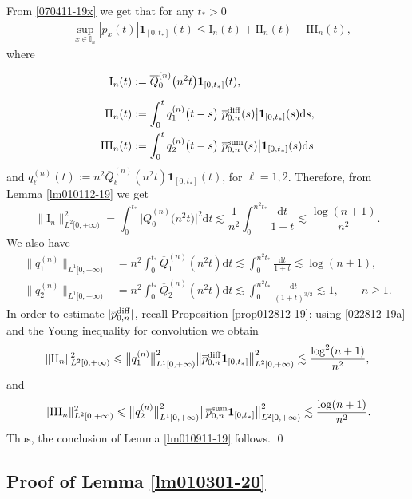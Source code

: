 \documentclass[EJP]{ejpecp} %
\newcommand\T{{\mathbb I}}
\renewcommand{\ge}{\geqslant}
\renewcommand{\le}{\leqslant}
\newcommand{\dd  }{\mathrm{d}}
\renewcommand{\bar}{\overline}
\numberwithin{equation}{section}
\begin{document}
From \eqref{070411-19x} we get that for any $t_*>0$
\begin{align}
  \label{070411-19xs}
  & 
\sup_{x\in\T_n}|\bar p_x(t)|\mathbf{1}_{[0,t_*]}(t)
   \le \mathrm{I}_{n}(t)+ \mathrm{II}_{n}(t)+ \mathrm{III}_{n}(t),
\end{align}
where
\begin{align*}
\mathrm{I}_{n}(t)&:=\bar Q_{0}^{(n)}\big(n^2t\big) \mathbf{1}_{[0,t_*]}(t), \vphantom{\bigg(} \\
\mathrm{II}_{n}(t)&:=\int_0^tq_{1}^{(n)}\big(t-s\big)\big|\bar
    p_{0,n}^{\rm diff}(s) \big| \mathbf{1}_{[0,t_*]}(s)\dd s,\notag\\
 \mathrm{III}_{n}(t)&:=\int_0^tq_{2}^{(n)}\big(t-s\big)
    \big|\bar p_{0,n}^{\rm sum}(s)\big|\mathbf{1}_{[0,t_*]}(s) \dd s
\end{align*}
and 
 $q_{\ell}^{(n)}(t):= n^2\bar Q_\ell^{(n)}(n^2t)\mathbf{1}_{[0,t_*]}(t)$, for
 $\ell=1,2$. 
Therefore, from Lemma \ref{lm010112-19} we get
$$
\|\mathrm{I}_{n}\|_{L^2[0,+\infty)}^2=\int_0^{t_*}\big|\bar Q_{0}^{(n)}\big(n^2t\big) \big|^2\dd
t \lesssim \frac{1}{n^2}\int_0^{n^2t_*}\frac{\dd t}{1+t}\lesssim  \frac{\log (n+1)}{n^2}.
$$
We also have
\begin{align*}
\|q_{1}^{(n)}\|_{L^1[0,+\infty)}&= n^2\int_0^{t_*}\bar Q_1^{(n)}(n^2t)\dd t
\lesssim \int_0^{n^2t_*}\frac{\dd t}{1+t}\lesssim \log (n+1), \\
\|q_{2}^{(n)}\|_{L^1[0,+\infty)}	&=n^2\int_0^{t_*}\bar Q_2^{(n)}(n^2t)\dd t
\lesssim  \int_0^{n^2t_*}\frac{\dd t}{(1+t)^{3/2}}\lesssim 1, \qquad n\ge1.
\end{align*}
In order to estimate $|\bar
    p_{0,n}^{\rm diff}|$, recall Proposition \ref{prop012812-19}: using \eqref{022812-19a} and  the Young inequality for convolution we obtain
$$
\|\mathrm{II}_{n}\|_{L^2[0,+\infty)}^2\le \big\|q_{1}^{(n)}\big\|_{L^1[0,+\infty)}^2 \big\|\bar
    p_{0,n}^{\rm diff} \mathbf{1}_{[0,t_*]}\big\|_{L^2[0,+\infty)}^2 \lesssim \frac{\log^2 (n+1)}{n^2}, 
$$
and
$$
\|\mathrm{III}_{n}\|_{L^2[0,+\infty)}^2\le \big\|q_{2}^{(n)}\big\|_{L^1[0,+\infty)}^2 \big\|\bar
    p_{0,n}^{\rm sum} \mathbf{1}_{[0,t_*]}\big\|_{L^2[0,+\infty)}^2 \lesssim \frac{\log (n+1)}{n^2}.
$$
Thus, the conclusion of Lemma \ref{lm010911-19} follows. \qed





\subsection{Proof of Lemma \ref{lm010301-20}}
\end{document}
